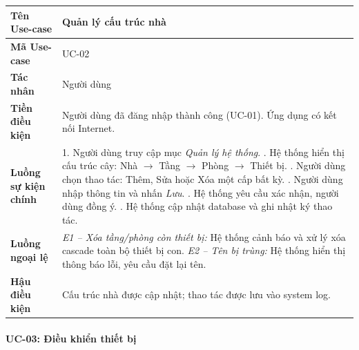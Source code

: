 \begin{table}[H]
\centering
\renewcommand{\arraystretch}{1.4}
\begin{tabular}{|p{3.8cm}|p{10cm}|}
\hline
\textbf{Tên Use-case}       & Quản lý cấu trúc nhà \\ \hline
\textbf{Mã Use-case}        & UC-02 \\ \hline
\textbf{Tác nhân}           & Người dùng \\ \hline
\textbf{Tiền điều kiện}     & Người dùng đã đăng nhập thành công (UC-01). Ứng dụng có kết nối Internet. \\ \hline
\textbf{Luồng sự kiện chính} & 
1. Người dùng truy cập mục \textit{Quản lý hệ thống}. \newline
2. Hệ thống hiển thị cấu trúc cây: Nhà $\rightarrow$ Tầng $\rightarrow$ Phòng $\rightarrow$ Thiết bị. \newline
3. Người dùng chọn thao tác: Thêm, Sửa hoặc Xóa một cấp bất kỳ. \newline
4. Người dùng nhập thông tin và nhấn \textit{Lưu}. \newline
5. Hệ thống yêu cầu xác nhận, người dùng đồng ý. \newline
6. Hệ thống cập nhật database và ghi nhật ký thao tác. \\ \hline
\textbf{Luồng ngoại lệ}     & 
\textit{E1 -- Xóa tầng/phòng còn thiết bị:} Hệ thống cảnh báo và xử lý xóa cascade toàn bộ thiết bị con. \newline
\textit{E2 -- Tên bị trùng:} Hệ thống hiển thị thông báo lỗi, yêu cầu đặt lại tên. \\ \hline
\textbf{Hậu điều kiện}      & Cấu trúc nhà được cập nhật; thao tác được lưu vào system log. \\ \hline
\end{tabular}
\end{table}

\paragraph{UC-03: Điều khiển thiết bị}

